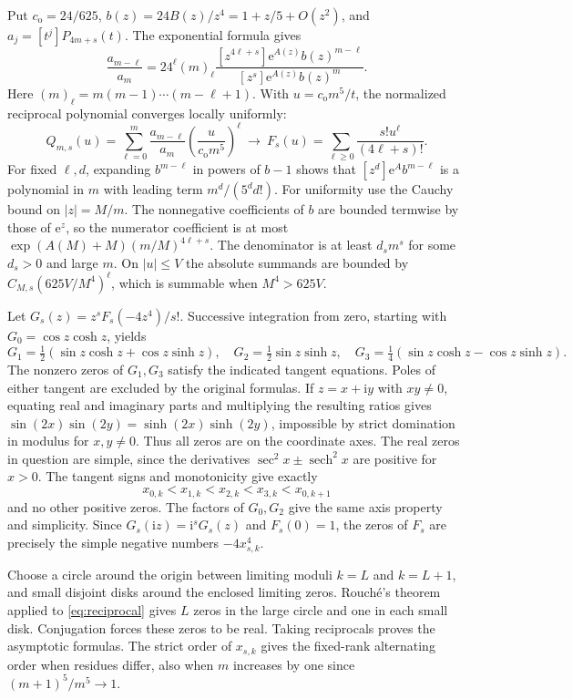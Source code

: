 \documentclass[11pt]{article}
\newcommand{\ee}{\mathrm e}
\newcommand{\ii}{\mathrm i}
\begin{document}
Put \(c_{\mathrm o}=24/625\), \(b(z)=24B(z)/z^4=1+z/5+O(z^2)\), and \(a_j=[t^j]P_{4m+s}(t)\). The exponential formula gives
\[
 \frac{a_{m-\ell}}{a_m}=24^\ell(m)_\ell
 \frac{[z^{4\ell+s}]\ee^{A(z)}b(z)^{m-\ell}}
 {[z^s]\ee^{A(z)}b(z)^m}.
\]
Here \((m)_\ell=m(m-1)\cdots(m-\ell+1)\). With \(u=c_{\mathrm o}m^5/t\), the normalized reciprocal polynomial converges locally uniformly:
\begin{equation}
 Q_{m,s}(u)=\sum_{\ell=0}^m\frac{a_{m-\ell}}{a_m}
       \left(\frac{u}{c_{\mathrm o}m^5}\right)^\ell
 \ \longrightarrow\ F_s(u)=\sum_{\ell\ge0}\frac{s!u^\ell}{(4\ell+s)!}.
 \label{eq:reciprocal}
\end{equation}
For fixed \(\ell,d\), expanding \(b^{m-\ell}\) in powers of \(b-1\) shows that \([z^d]\ee^A b^{m-\ell}\) is a polynomial in \(m\) with leading term \(m^d/(5^d d!)\). For uniformity use the Cauchy bound on \(|z|=M/m\). The nonnegative coefficients of \(b\) are bounded termwise by those of \(\ee^z\), so the numerator coefficient is at most \(\exp(A(M)+M)(m/M)^{4\ell+s}\). The denominator is at least \(d_s m^s\) for some \(d_s>0\) and large \(m\). On \(|u|\le V\) the absolute summands are bounded by \(C_{M,s}(625V/M^4)^\ell\), which is summable when \(M^4>625V\).

Let \(G_s(z)=z^s F_s(-4z^4)/s!\). Successive integration from zero, starting with \(G_0=\cos z\cosh z\), yields
\[
 G_1=\tfrac12(\sin z\cosh z+\cos z\sinh z),\quad
 G_2=\tfrac12\sin z\sinh z,\quad
 G_3=\tfrac14(\sin z\cosh z-\cos z\sinh z).
\]
The nonzero zeros of \(G_1,G_3\) satisfy the indicated tangent equations. Poles of either tangent are excluded by the original formulas. If \(z=x+\ii y\) with \(xy\ne0\), equating real and imaginary parts and multiplying the resulting ratios gives
\(\sin(2x)\sin(2y)=\sinh(2x)\sinh(2y)\), impossible by strict domination in modulus for \(x,y\ne0\). Thus all zeros are on the coordinate axes. The real zeros in question are simple, since the derivatives \(\sec^2 x\pm\operatorname{sech}^2 x\) are positive for \(x>0\). The tangent signs and monotonicity give exactly
\[
 x_{0,k}<x_{1,k}<x_{2,k}<x_{3,k}<x_{0,k+1}
\]
and no other positive zeros. The factors of \(G_0,G_2\) give the same axis property and simplicity. Since \(G_s(\ii z)=\ii^s G_s(z)\) and \(F_s(0)=1\), the zeros of \(F_s\) are precisely the simple negative numbers \(-4x_{s,k}^4\).

Choose a circle around the origin between limiting moduli \(k=L\) and \(k=L+1\), and small disjoint disks around the enclosed limiting zeros. Rouché's theorem applied to \eqref{eq:reciprocal} gives \(L\) zeros in the large circle and one in each small disk. Conjugation forces these zeros to be real. Taking reciprocals proves the asymptotic formulas. The strict order of \(x_{s,k}\) gives the fixed-rank alternating order when residues differ, also when \(m\) increases by one since \((m+1)^5/m^5\to1\).
\end{document}
